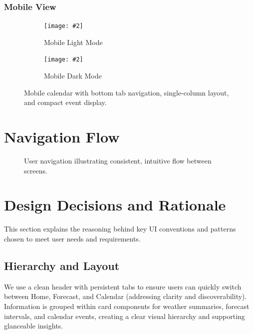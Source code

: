 \documentclass[fontsize=13pt,a4paper]{article}
\newcommand{\maxgraph}[2][]{%
  \texttt{[image: \#2]}%
}
\begin{document}
\subsubsection*{Mobile View}
\FloatBarrier
\begin{figure}[H]
  \centering
  \begin{subfigure}{0.48\linewidth}
    \maxgraph[width=\linewidth]{calendar_lightmode_mobile.jpg}
    \caption{Mobile Light Mode}
  \end{subfigure}\hfill
  \begin{subfigure}{0.48\linewidth}
    \maxgraph[width=\linewidth]{calendar_darkmode_mobile.jpg}
    \caption{Mobile Dark Mode}
  \end{subfigure}
  \caption{Mobile calendar with bottom tab navigation, single-column layout, and compact event display.}
  \label{fig:calendar_mobile}
\end{figure}
\FloatBarrier

\section{Navigation Flow}
\FloatBarrier
\begin{figure}[H]
  \centering
  \caption{User navigation illustrating consistent, intuitive flow between screens.}
  \label{fig:flow}
\end{figure}
\FloatBarrier

\section{Design Decisions and Rationale}
This section explains the reasoning behind key UI conventions and patterns chosen to meet user needs and requirements.

\subsection{Hierarchy and Layout}
We use a clean header with persistent tabs to ensure users can quickly switch between Home, Forecast, and Calendar (addressing clarity and discoverability). Information is grouped within card components for weather summaries, forecast intervals, and calendar events, creating a clear visual hierarchy and supporting glanceable insights.
\end{document}
